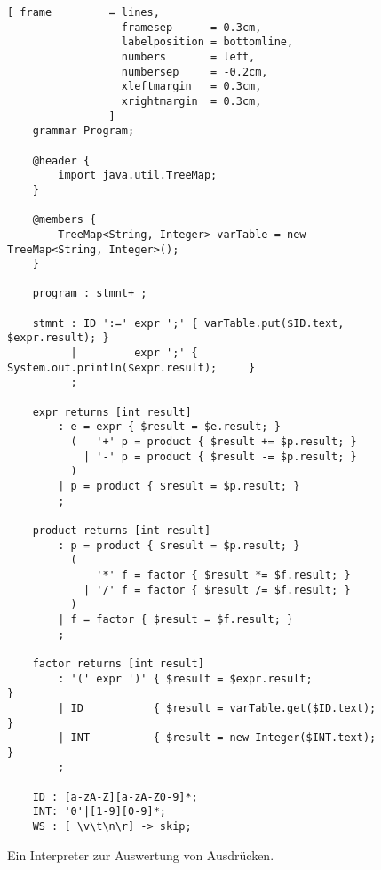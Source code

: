 \begin{figure}[!ht]
\centering
\begin{Verbatim}[ frame         = lines, 
                  framesep      = 0.3cm, 
                  labelposition = bottomline,
                  numbers       = left,
                  numbersep     = -0.2cm,
                  xleftmargin   = 0.3cm,
                  xrightmargin  = 0.3cm,
                ]
    grammar Program;
     
    @header {
        import java.util.TreeMap;
    }
    
    @members {
        TreeMap<String, Integer> varTable = new TreeMap<String, Integer>();
    }
    
    program : stmnt+ ;
    
    stmnt : ID ':=' expr ';' { varTable.put($ID.text, $expr.result); }
          |         expr ';' { System.out.println($expr.result);     }
          ;    
    
    expr returns [int result]
        : e = expr { $result = $e.result; }
          (   '+' p = product { $result += $p.result; }
            | '-' p = product { $result -= $p.result; }
          )
        | p = product { $result = $p.result; }
        ;
    
    product returns [int result]
        : p = product { $result = $p.result; }
          (
              '*' f = factor { $result *= $f.result; }
            | '/' f = factor { $result /= $f.result; }
          )
        | f = factor { $result = $f.result; }
        ;
    
    factor returns [int result]
        : '(' expr ')' { $result = $expr.result;           }
        | ID           { $result = varTable.get($ID.text); }
        | INT          { $result = new Integer($INT.text); }
        ;
    
    ID : [a-zA-Z][a-zA-Z0-9]*;
    INT: '0'|[1-9][0-9]*;
    WS : [ \v\t\n\r] -> skip; 
\end{Verbatim} 
\vspace*{-0.3cm}
\caption{Ein Interpreter zur Auswertung von Ausdr\"ucken.}
\label{fig:Program.g4-2}
\end{figure}

